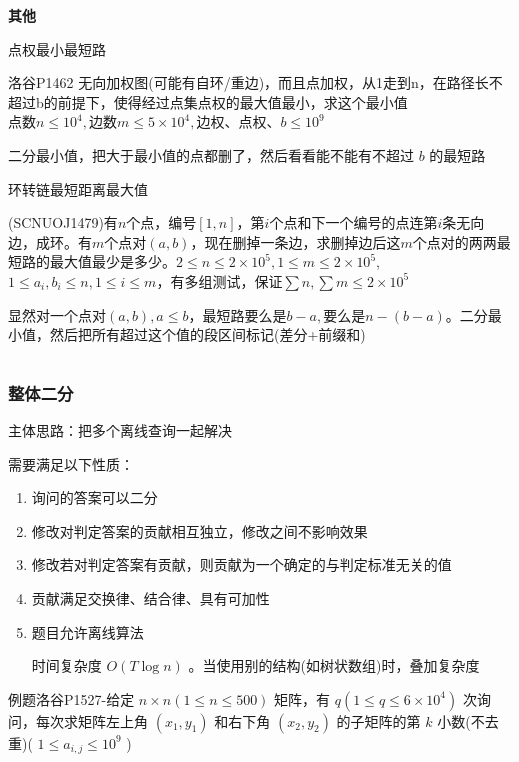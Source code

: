 \documentclass[twocolumn,10pt]{ctexart}
\makeatletter
\newcommand{\hfive}[1]{\par\addvspace{6pt}\@afterindentfalse
  {\noindent\bfseries\normalsize #1}\par\nobreak\vspace{2pt}}
\makeatother
\begin{document}
\inputminted{cpp}{code/p1419_binaryans.cpp}

\hfive{其他}

点权最小最短路

\begin{notebox}
洛谷P1462 无向加权图(可能有自环/重边)，而且点加权，从1走到n，在路径长不超过b的前提下，使得经过点集点权的最大值最小，求这个最小值 $\text{点数}n\le10^4,\allowbreak{}\text{边数}m\le5\times10^4,\allowbreak{}\text{边权、点权、}b\le10^9$
\end{notebox}

二分最小值，把大于最小值的点都删了，然后看看能不能有不超过 $b$ 的最短路

环转链最短距离最大值

\begin{notebox}
(SCNUOJ1479)有$n$个点，编号$[1,n]$，第$i$个点和下一个编号的点连第$i$条无向边，成环。有$m$个点对$(a,b)$，现在删掉一条边，求删掉边后这$m$个点对的两两最短路的最大值最少是多少。$2\le n\le2\times10^5,\allowbreak{}1\le m\le2\times10^5$,$1\le a_i,b_i\le n,1\le i\le m$，有多组测试，保证$\sum n,\sum m\le2\times10^5$
\end{notebox}

显然对一个点对$(a,b),a\le b$，最短路要么是$b-a,$要么是$n-(b-a)$。二分最小值，然后把所有超过这个值的段区间标记(差分+前缀和)

\inputminted{cpp}{code/ext_068.cpp}

\subsubsection{整体二分}

主体思路：把多个离线查询一起解决

需要满足以下性质：

\begin{enumerate}
\item 询问的答案可以二分
\item 修改对判定答案的贡献相互独立，修改之间不影响效果
\item 修改若对判定答案有贡献，则贡献为一个确定的与判定标准无关的值
\item 贡献满足交换律、结合律、具有可加性
\item 题目允许离线算法

时间复杂度 $O(T\log n)$ 。当使用别的结构(如树状数组)时，叠加复杂度
\end{enumerate}

\begin{notebox}
例题洛谷P1527-给定 $n\times n(1\le n\le500)$ 矩阵，有 $q(1\le q\le6\times10^4)$ 次询问，每次求矩阵左上角 $(x_1,y_1)$ 和右下角 $(x_2,y_2)$ 的子矩阵的第 $k$ 小数(不去重)( $1\le a_{i,j}\le10^9$ )
\end{notebox}
\end{document}
